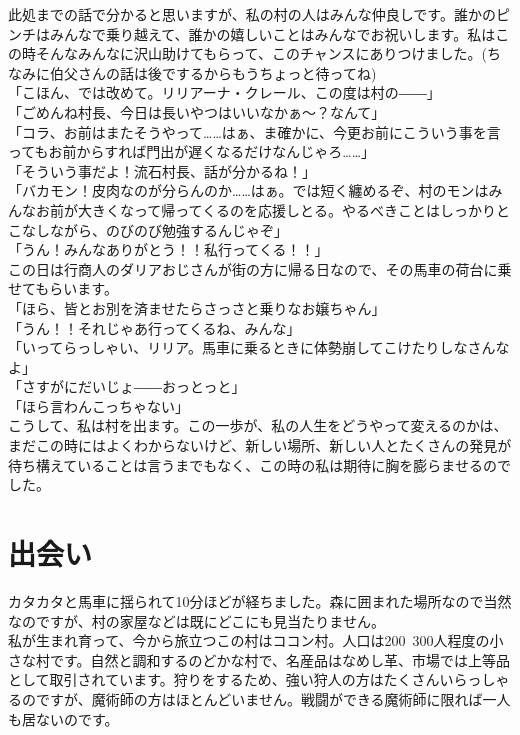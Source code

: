 \documentclass[oneside, a4paper]{jsbook}
\begin{document}
此処までの話で分かると思いますが、私の村の人はみんな仲良しです。誰かのピンチはみんなで乗り越えて、誰かの嬉しいことはみんなでお祝いします。私はこの時そんなみんなに沢山助けてもらって、このチャンスにありつけました。(ちなみに伯父さんの話は後でするからもうちょっと待ってね)\\

\noindent
「こほん、では改めて。リリアーナ・クレール、この度は村の――」\\
「ごめんね村長、今日は長いやつはいいなかぁ～？なんて」\\
「コラ、お前はまたそうやって……はぁ、ま確かに、今更お前にこういう事を言ってもお前からすれば門出が遅くなるだけなんじゃろ……」\\
「そういう事だよ！流石村長、話が分かるね！」\\
「バカモン！皮肉なのが分らんのか……はぁ。では短く纏めるぞ、村のモンはみんなお前が大きくなって帰ってくるのを応援しとる。やるべきことはしっかりとこなしながら、のびのび勉強するんじゃぞ」\\
「うん！みんなありがとう！！私行ってくる！！」\\

この日は行商人のダリアおじさんが街の方に帰る日なので、その馬車の荷台に乗せてもらいます。\\

\noindent
「ほら、皆とお別を済ませたらさっさと乗りなお嬢ちゃん」\\
「うん！！それじゃあ行ってくるね、みんな」\\
「いってらっしゃい、リリア。馬車に乗るときに体勢崩してこけたりしなさんなよ」\\
「さすがにだいじょ――おっとっと」\\
「ほら言わんこっちゃない」\\

こうして、私は村を出ます。この一歩が、私の人生をどうやって変えるのかは、まだこの時にはよくわからないけど、新しい場所、新しい人とたくさんの発見が待ち構えていることは言うまでもなく、この時の私は期待に胸を膨らませるのでした。

\newpage

\section{出会い}

カタカタと馬車に揺られて10分ほどが経ちました。森に囲まれた場所なので当然なのですが、村の家屋などは既にどこにも見当たりません。\\

私が生まれ育って、今から旅立つこの村はココン村。人口は200~300人程度の小さな村です。自然と調和するのどかな村で、名産品はなめし革、市場では上等品として取引されています。狩りをするため、強い狩人の方はたくさんいらっしゃるのですが、魔術師の方はほとんどいません。戦闘ができる魔術師に限れば一人も居ないのです。\\
\end{document}
